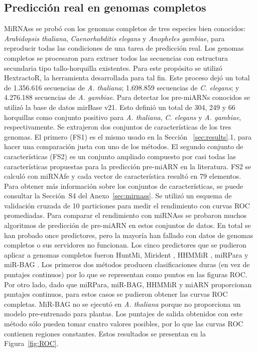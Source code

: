 \subsection{Predicción real en genomas completos} \label{sec:results:genome-wide}

MiRNAss se probó con los genomas completos de tres especies bien conocidos: \textit{Arabidopsis thaliana}, \textit{Caenorhabditis elegans} y \textit{Anopheles
gambiae}, para reproducir todas las condiciones de una tarea de predicción real. Los genomas completos se procesaron para extraer todos las secuencias con
estructura secundaria tipo tallo-horquilla existentes. Para este propósito se utilizó HextractoR, la herramienta desarrollada para tal fin. Este proceso dejó un
total de 1.356.616 secuencias de \textit{A. thaliana}; 1.698.859 secuencias de \textit{C. elegans}; y 4.276.188 secuencias de \textit{A. gambiae}.  Para
detectar los pre-miARNs conocidos se utilizó la base de datos mirBase v21. Esto definió un total de 304, 249 y 66 horquillas como conjunto positivo para
\textit{A. thaliana}, \textit{C. elegans} y \textit{A. gambiae}, respectivamente.
Se extrajeron dos conjuntos de características de los tres genomas. El primero (FS1) es el mismo usado en la Sección ~\ref{sec:results}.1, para hacer una
comparación justa con uno de los métodos. El segundo conjunto de características (FS2) es un conjunto ampliado compuesto por casi todas las características
propuestas para la predicción pre-miARN en la literatura. FS2 se calculó con miRNAfe y cada vector de característica resultó en 79 elementos. Para obtener más
información sobre los conjuntos de características, se puede consultar la Sección~S4 del Anexo~\ref{sec:mirnass}. Se utilizó un esquema de validación cruzada de
10 particiones para medir el rendimiento con curvas ROC promediadas.
Para comparar el rendimiento con miRNAss se probaron muchos algoritmos de predicción de pre-miARN en estos conjuntos de datos. En total se han probado once
predictores, pero la mayoría han fallado con datos de genomas completos o sus servidores no funcionan. Los cinco predictores que se pudieron aplicar a genomas
completos fueron HuntMi, Mirident \citep{liu2012integrated}, HHMMiR \citep{kadri2009hhmmir}, miRPara \citep{wu2011mirpara} y miR-BAG \citep{jha2012mirbag}. Los
primeros dos métodos producen clasificaciones duras (en vez de puntajes continuos) por lo que se representan como puntos en las figuras ROC. Por otro lado, dado
que miRPara, miR-BAG, HHMMiR y miARN proporcionan puntajes continuos, para estos casos se pudieron obtener las curvas ROC completas. MiR-BAG no se ejecutó en
\textit{A. thaliana} porque no proporciona un modelo pre-entrenado para plantas. Los puntajes de salida obtenidos con este método sólo pueden tomar cuatro
valores posibles, por lo que las curvas ROC contienen regiones constantes. Estos resultados se presentan en la Figura~\ref{fig:ROC}.

